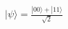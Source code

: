 \documentclass[preview]{standalone}
\begin{document}
\begin{align*}
|\psi\rangle = \frac{ |00 \rangle + |11 \rangle}{\sqrt{2}}
\end{align*}
\end{document}
